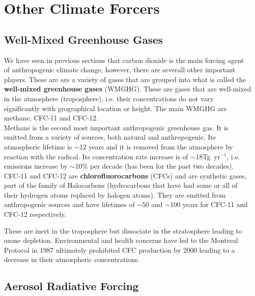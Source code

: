 \section{Other Climate Forcers}
\label{sec:other-climate-forcers}

\subsection{Well-Mixed Greenhouse Gases}
\label{sec:well-mixed-greenhouse-gases}

We have seen in previous sections that carbon dioxide is the main forcing agent of anthropogenic climate change, however,
there are severall other important players. These are are a variety of gases that are grouped into what is called the
\textbf{well-mixed greenhouse gases} (WMGHG). These are gases that are well-mixed in the atmosphere (troposphere), i.e. 
their concentrations do not vary significantly with grographical location or height. The main WMGHG are methane, CFC-11
and CFC-12.\\

Methane is the second most important anthropogenic greenhouse gas. It is emitted from a variety of sources, both natural
and anthropogenic. Its atmospheric lifetime is $\sim$12 years and it is removed from the atmosphere by reaction with the
 radical. Its concentration rate increase is of $\sim$18Tg\ yr$^{-1}$, i.e. emissions increase by $\sim$10\%
per decade (has been for the past two decades).\\

CFC-11 and CFC-12 are \textbf{chlorofluorocarbons} (CFCs) and are synthetic gases, part of the family of Halocarbons
(hydrocarbons that have had some or all of their hydrogen atoms replaced by halogen atoms). They are emitted from
anthropogenic sources and have lifetimes of $\sim$50 and $\sim$100 years for CFC-11 and CFC-12 respectively. 

\noindent These are inert in the troposphere but dissociate in the stratosphere leading to ozone depletion. Environmental and 
health concerns have led to the Montreal Protocol in 1987 ultimately prohibited CFC production by 2000 leading to a
decrease in their atmospheric concentrations.

\subsection{Aerosol Radiative Forcing}
\label{sec:aerosol-radiative-forcing}

